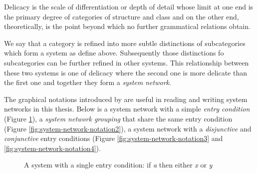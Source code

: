 \begin{definition}[Delicacy]\label{def:delicacy-sydney}
	Delicacy is the scale of differentiation or depth of detail whose limit at one end is the primary degree of categories of structure  and class and on the other end, theoretically, is the point beyond which no further grammatical relations obtain. \citet[58]{Halliday2002}  
\end{definition}

We say that a category is refined into more subtle distinctions of subcategories which form a system as define above. Subsequently those distinctions fo subcategories can be further refined in other systems. This relationship between these two systems is one of delicacy where the second one is more delicate than the first one and together they form a \textit{system network}.

The graphical notations introduced by \citet{Halliday2013} are useful in reading and writing system networks in this thesis. Below is a system network with a simple \textit{entry condition} (Figure \ref{fig:system-network-notation1}), a \textit{system network grouping} that share the same entry condition (Figure \ref{fig:system-network-notation2}), a system network with a \textit{disjunctive} and \textit{conjunctive} entry conditions (Figure \ref{fig:system-network-notation3} and \ref{fig:system-network-notation4}). 
\begin{figure}[H]
    \centering
    \caption{A system with a single entry condition: if \textit{a} then either \textit{x} or \textit{y}}
    \label{fig:system-network-notation1}
\end{figure}

